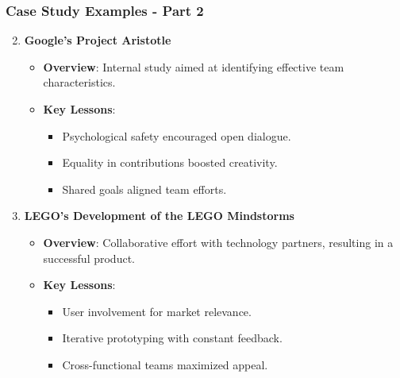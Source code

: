 \documentclass[aspectratio=169]{beamer}
\begin{document}
\begin{frame}[fragile]
    \frametitle{Case Study Examples - Part 2}
    \begin{enumerate}
        \setcounter{enumi}{1} %
        \item \textbf{Google’s Project Aristotle}
        \begin{itemize}
            \item \textbf{Overview}: Internal study aimed at identifying effective team characteristics.
            \item \textbf{Key Lessons}:
            \begin{itemize}
                \item Psychological safety encouraged open dialogue.
                \item Equality in contributions boosted creativity.
                \item Shared goals aligned team efforts.
            \end{itemize}
        \end{itemize}
        
        \vspace{1cm} %
        \item \textbf{LEGO’s Development of the LEGO Mindstorms}
        \begin{itemize}
            \item \textbf{Overview}: Collaborative effort with technology partners, resulting in a successful product.
            \item \textbf{Key Lessons}:
            \begin{itemize}
                \item User involvement for market relevance.
                \item Iterative prototyping with constant feedback.
                \item Cross-functional teams maximized appeal.
            \end{itemize}
        \end{itemize}
    \end{enumerate}
\end{frame}
\end{document}
